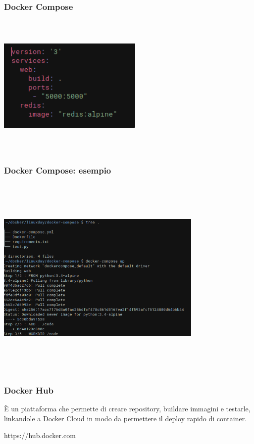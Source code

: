 \documentclass{beamer}
\begin{document}

\begin{frame}
    \frametitle{Docker Compose}
    \begin{center}
        \includegraphics[width=7cm,height=7cm,keepaspectratio]{docker_compose.png}
    \end{center}
\end{frame}


\begin{frame} 
    \frametitle{Docker Compose: esempio}
    \begin{center}
        \includegraphics[width=10cm,height=10cm,keepaspectratio]{compose.png}
    \end{center}
\end{frame}


\begin{frame}
    \frametitle{Docker Hub}
    \`E un piattaforma che permette di creare repository, buildare immagini e testarle, linkandole a Docker Cloud in modo da permettere 
    il deploy rapido di container.
    \newline
    \begin{center}
        https://hub.docker.com
    \end{center}
\end{frame}
\end{document}
